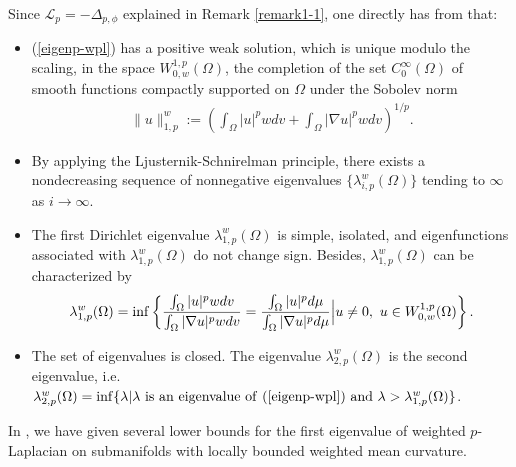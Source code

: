 \documentclass[12pt]{article}
\begin{document}
Since $\mathcal{L}_{p}=-\Delta_{p,\phi}$ explained in Remark
\ref{remark1-1}, one directly has from \cite[Section 2]{JM-1} that:
\begin{itemize}
\item (\ref{eigenp-wpl}) has a positive weak solution, which is unique modulo
the scaling, in the space $W^{1,p}_{0,w}(\Omega)$, the completion of
the set $C^{\infty}_{0}(\Omega)$ of smooth functions compactly
supported on $\Omega$ under the Sobolev norm
\begin{eqnarray*}
\|u\|^{w}_{1,p}:=\left(\int_{\Omega}|u|^{p}wdv+\int_{\Omega}|\nabla
u|^{p}wdv\right)^{1/p}.
\end{eqnarray*}

\item By applying the
Ljusternik-Schnirelman principle, there exists a nondecreasing
sequence of nonnegative eigenvalues $\{\lambda_{i,p}^{w}(\Omega)\}$
tending to $\infty$ as $i\rightarrow\infty$.

\item The first Dirichlet eigenvalue $\lambda_{1,p}^{w}(\Omega)$  is simple, isolated, and eigenfunctions
associated with $\lambda_{1,p}^{w}(\Omega)$ do not change sign.
Besides, $\lambda_{1,p}^{w}(\Omega)$ can be characterized by
\begin{eqnarray} \label{chr-2}
\lambda_{1,p}^{w}(\Omega)=\inf\left\{\frac{\int_{\Omega}|u|^{p}wdv}{\int_{\Omega}|\nabla
u|^{p}wdv}=\frac{\int_{\Omega}|u|^{p}d\mu}{\int_{\Omega}|\nabla
u|^{p}d\mu}\Big{|}u\neq0,~u\in W^{1,p}_{0,w}(\Omega)\right\}.
\end{eqnarray}

\item The set of eigenvalues is closed. The eigenvalue
$\lambda_{2,p}^{w}(\Omega)$ is the second eigenvalue, i.e.
$\lambda_{2,p}^{w}(\Omega)=\inf\{\lambda|\lambda~{\rm{is~an~eigenvalue~of~(\ref{eigenp-wpl})~and}}~\lambda>\lambda_{1,p}^{w}(\Omega)\}$.

\end{itemize}
In \cite[Section 3]{DMWX}, we have given several lower bounds for
the first eigenvalue of weighted $p$-Laplacian on submanifolds with
locally bounded weighted mean curvature.
\end{document}
